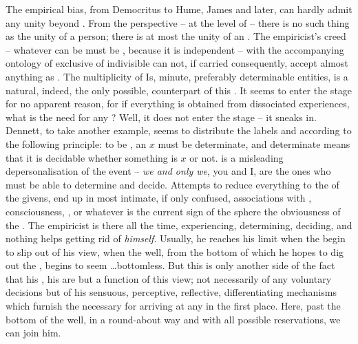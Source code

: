 The empirical bias, from Democritus to Hume, James and later, can hardly admit
any unity beyond .  From the 
perspective -- at the level of  -- there is no such thing as the 
unity of a person; there is at most the unity of an .  The empiricist's
creed -- whatever can be  must be , because it
is independent -- with the accompanying {ontology} of exclusive  of
indivisible  can not, if carried consequently, accept almost anything
as .  The multiplicity of Is, minute, preferably determinable
entities, is a natural, indeed, the only possible, counterpart of this
.  It seems to enter the stage for no apparent reason, for if
everything is obtained from dissociated experiences, what is the need for any
?  Well, it does not enter the stage -- it sneaks in.  Dennett, to take
another example, seems to distribute the labels  and 
according to the following principle: to be , an $x$ must be
determinate, and determinate means that it is decidable whether something is $x$
or not.  is a misleading depersonalisation
of the event -- {\em we and only we}, you and I, are the ones who must be able
to determine and decide.
Attempts to reduce everything to the  of the givens, end
up in most intimate, if only confused, associations with ,
consciousness, , or whatever is the current sign of the sphere
 the obviousness of the .  The empiricist is
there all the time, experiencing, determining, deciding, and nothing helps
getting rid of {\em himself}.  Usually, he reaches his limit when the
 begin to slip out of his view, when the well, from the bottom of
which he hopes to dig out the , begins to seem \ldots bottomless.
But this is only another side of the fact that his , his
 are but a function of this view; not necessarily of any voluntary
decisions but of his sensuous, perceptive, reflective, differentiating
mechanisms which furnish the  necessary for arriving at any
 in the first place.  Here, past the bottom of the well, in a
round-about way and with all possible reservations, we can join him.


